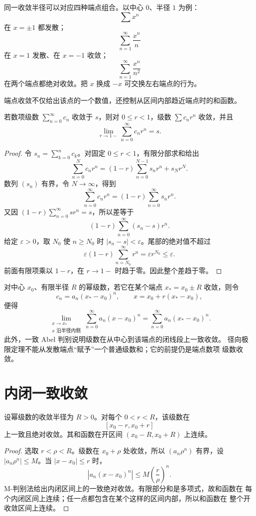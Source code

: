 同一收敛半径可以对应四种端点组合。以中心 \(0\)、半径 \(1\) 为例：
\[
 \sum x^n
\]
在 \(x=\pm1\) 都发散；
\[
 \sum_{n=1}^\infty\frac{x^n}{n}
\]
在 \(x=1\) 发散、在 \(x=-1\) 收敛；
\[
 \sum_{n=1}^\infty\frac{x^n}{n^2}
\]
在两个端点都绝对收敛。把 \(x\) 换成 \(-x\) 可交换左右端点的行为。

端点收敛不仅给出该点的一个数值，还控制从区间内部趋近端点时的和函数。

\begin{theorem}
\label{thm:abel-radial-limit}
若数项级数 \(\sum_{n=0}^\infty c_n\) 收敛于 \(s\)，则对
\(0\le r<1\)，级数 \(\sum c_nr^n\) 收敛，并且
\[
 \lim_{r\to1-}\sum_{n=0}^\infty c_nr^n=s.
\]
\end{theorem}

\begin{proof}
令 \(s_n=\sum_{k=0}^nc_k\)。对固定 \(0\le r<1\)，有限分部求和给出
\[
 \sum_{n=0}^Nc_nr^n
 =(1-r)\sum_{n=0}^{N-1}s_nr^n+s_Nr^N.
\]
数列 \((s_n)\) 有界，令 \(N\to\infty\)，得到
\[
 \sum_{n=0}^\infty c_nr^n
 =(1-r)\sum_{n=0}^\infty s_nr^n.
\]
又因 \((1-r)\sum_{n=0}^\infty sr^n=s\)，所以差等于
\[
 (1-r)\sum_{n=0}^\infty(s_n-s)r^n.
\]
给定 \(\varepsilon>0\)，取 \(N_0\) 使 \(n\ge N_0\) 时
\(|s_n-s|<\varepsilon\)。尾部的绝对值不超过
\[
 \varepsilon(1-r)\sum_{n=N_0}^\infty r^n
 =\varepsilon r^{N_0}\le\varepsilon.
\]
前面有限项乘以 \(1-r\)，在 \(r\to1-\) 时趋于零。因此整个差趋于零。
\end{proof}

对中心 \(x_0\)、有限半径 \(R\) 的幂级数，若它在某个端点
\(x_*=x_0\pm R\) 收敛，则令
\[
 c_n=a_n(x_*-x_0)^n,\qquad
 x=x_0+r(x_*-x_0),
\]
便得
\[
 \lim_{\substack{x\to x_*\\x\text{ 沿半径内侧}}}
 \sum_{n=0}^\infty a_n(x-x_0)^n
 =\sum_{n=0}^\infty a_n(x_*-x_0)^n.
\]
此外，一致 Abel 判别说明级数在从中心到该端点的闭线段上一致收敛。
径向极限定理不能从发散端点“赋予”一个普通级数和；它的前提仍是端点数项
级数收敛。

\section{内闭一致收敛}

\begin{theorem}
\label{thm:power-series-compact-uniform}
设幂级数的收敛半径为 \(R>0\)。对每个 \(0<r<R\)，该级数在
\[
 [x_0-r,x_0+r]
\]
上一致且绝对收敛。其和函数在开区间
\((x_0-R,x_0+R)\) 上连续。
\end{theorem}

\begin{proof}
选取 \(r<\rho<R\)。级数在 \(x_0+\rho\) 处收敛，所以
\((a_n\rho^n)\) 有界，设 \(|a_n\rho^n|\le M\)。当
\(|x-x_0|\le r\) 时，
\[
 |a_n(x-x_0)^n|
 \le M\left(\frac r\rho\right)^n.
\]
M-判别法给出内闭区间上的一致绝对收敛。有限部分和是多项式，故和函数在
每个内闭区间上连续；任一点都包含在某个这样的区间内部，所以和函数在
整个开收敛区间上连续。
\end{proof}

